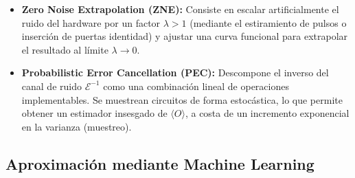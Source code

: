 \begin{itemize}
    \item \textbf{Zero Noise Extrapolation (ZNE):} Consiste en escalar artificialmente el ruido del hardware por un factor $\lambda > 1$ (mediante el estiramiento de pulsos o inserción de puertas identidad) y ajustar una curva funcional para extrapolar el resultado al límite $\lambda \to 0$.
    \item \textbf{Probabilistic Error Cancellation (PEC):} Descompone el inverso del canal de ruido $\mathcal{E}^{-1}$ como una combinación lineal de operaciones implementables. Se muestrean circuitos de forma estocástica, lo que permite obtener un estimador insesgado de $\langle O \rangle$, a costa de un incremento exponencial en la varianza (muestreo).
\end{itemize}

\subsection{Aproximación mediante Machine Learning}
